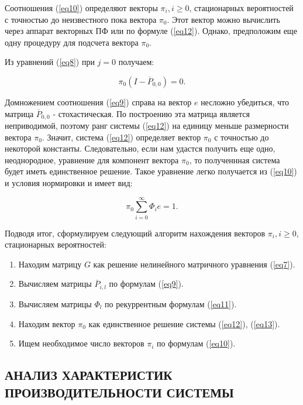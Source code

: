 \documentclass[12pt, a4paper]{article}
\begin{document}
Соотношения (\ref{eq10}) определяют векторы $\pi_i, i \geq 0$, стационарных вероятностей с точностью до неизвестного пока вектора $\pi_0$. Этот вектор можно вычислить через аппарат векторных ПФ или по формуле (\ref{eq12}). Однако, предположим еще одну процедуру для подсчета вектора $\pi_0$.

Из уравнений (\ref{eq8}) при $j = 0$ получаем:

\begin{equation}
\label{eq12}
\pi_0(I - \overline{P}_{0, 0}) = 0. 
\end{equation}

Домножением соотношения (\ref{eq9}) справа на вектор $e$ несложно убедиться, что матрица $\overline{P}_{0, 0}$ - стохастическая. По построению эта матрица является неприводимой, поэтому ранг системы (\ref{eq12}) на единицу меньше размерности вектора $\pi_0$. Значит, система (\ref{eq12}) определяет вектор $\pi_0$ с точностью до некоторой константы. Следовательно, если нам удастся получить еще одно, неоднородное, уравнение для компонент вектора $\pi_0$, то полученнная система будет иметь единственное решение. Такое уравнение легко получается из (\ref{eq10}) и условия нормировки и имеет вид: 

\begin{equation}
\label{eq13}
\pi_0 \sum\limits_{i = 0}^{\infty} \Phi_i e = 1. 
\end{equation}

Подводя итог, сформулируем следующий алгоритм нахождения векторов $\pi_i, i \geq 0$, стационарных вероятностей:

\vspace{10pt}
\begin{enumerate}
	\item Находим матрицу $G$ как решение нелинейного матричного уравнения (\ref{eq7}).
	\item Вычисляем матрицы $\overline{P}_{i, l}$ по формулам (\ref{eq9}).
	\item Вычисляем матрицы $\Phi_l$ по рекуррентным формулам (\ref{eq11}).
	\item Находим вектор $\pi_0$ как единственное решение системы (\ref{eq12}), (\ref{eq13}).
	\item Ищем необходимое число векторов $\pi_i$ по формулам (\ref{eq10}).
\end{enumerate}
\pagebreak

\begin{flushleft}
	\section{АНАЛИЗ ХАРАКТЕРИСТИК ПРОИЗВОДИТЕЛЬНОСТИ СИСТЕМЫ}
\end{flushleft}
\setcounter{equation}{0}
\setcounter{figure}{0}
\setcounter{table}{0}
\end{document}
